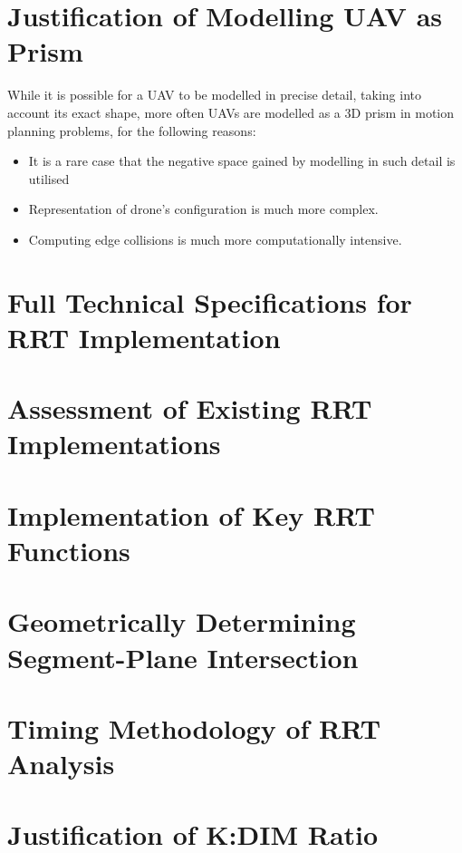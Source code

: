 
\section{Justification of Modelling UAV as Prism}
\label{section:rrt_appendix_modelling}
    While it is possible for a \gls{UAV} to be modelled in precise detail, taking into account its exact shape, more often \glspl{UAV} are modelled as a 3D prism in motion planning problems, for the following reasons:
    \begin{itemize}
    \item It is a rare case that the negative space gained by modelling in such detail is utilised
    \item Representation of drone's configuration is much more complex.
    \item Computing edge collisions is much more computationally intensive.
    \end{itemize}

    

\section{Full Technical Specifications for RRT Implementation}
\label{section:rrt_appendix_tech_specs}
    

\section{Assessment of Existing RRT Implementations}
\label{section:rrt_appendix_existing_implementations}
    

\section{Implementation of Key RRT Functions}
\label{section:rrt_appendix_function_impl}
    

\newpage
\section{Geometrically Determining Segment-Plane Intersection}
\label{section:rrt_appendix_line_plane_intersection}
    

\section{Timing Methodology of RRT Analysis}
\label{section:rrt_appendix_timing}
    
\newpage
\section{Justification of K:DIM Ratio}